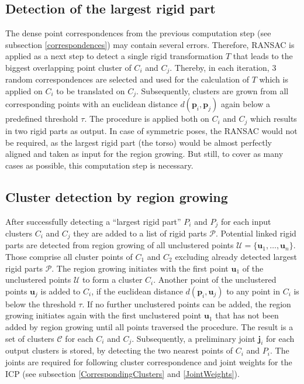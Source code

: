 \subsection{Detection of the largest rigid part}
\label{detectionLRP}
The dense point correspondences from the previous computation step (see subsection \ref{correspondences}) may contain several errors. Therefore, RANSAC is applied as a next step to detect a single rigid transformation $T$ that leads to the biggest overlapping point cluster of $C_i$ and $C_j$. Thereby, in each iteration, 3 random correspondences are selected and used for the calculation of $T$ which is applied on $C_i$ to be translated on $C_j$. Subsequently, clusters are grown from all corresponding points with an euclidean distance $d(\boldsymbol{p}_i,\boldsymbol{p}_j)$ again below a predefined threshold $\tau$. The procedure is applied both on $C_i$ and $C_j$ which results in two rigid parts as output. In case of symmetric poses, the RANSAC would not be required, as the largest rigid part (the torso) would be almost perfectly aligned and taken as input for the region growing. But still, to cover as many cases as possible, this computation step is necessary. 

\subsection{Cluster detection by region growing}
\label{cluster}
After successfully detecting a ``largest rigid part'' $P_i$ and $P_j$ for each input clusters $C_i$ and $C_j$ they are added to a list of rigid parts $\mathcal{P}$. Potential linked rigid parts are detected from region growing of all unclustered points $\mathcal{U} =  \{\boldsymbol{u}_1,\ldots,\boldsymbol{u}_n\}$. Those comprise all cluster points of $C_1$ and $C_2$ excluding already detected largest rigid parts $\mathcal{P}$. The region growing initiates with the first point $\boldsymbol{u}_1$ of the unclustered points $\mathcal{U}$ to form a cluster $C_i$. Another point of the unclustered points $\boldsymbol{u}_j$ is added to $C_i$, if the euclidean distance $d(\boldsymbol{p}_i,\boldsymbol{u}_j)$ to any point in $C_i$ is below the threshold $\tau$. If no further unclustered points can be added, the region growing initiates again with the first unclustered point $\boldsymbol{u}_1$ that has not been added by region growing until all points traversed the procedure. The result is a set of clusters $\mathcal{C}$ for each $C_i$ and $C_j$. Subsequently, a preliminary joint $\boldsymbol{j}_i$ for each output clusters is stored, by detecting the two nearest points of $C_i$ and $P_i$. The joints are required for following cluster correspondence and joint weights for the ICP (see subsection \ref{CorrespondingClusters} and \ref{JointWeights}).

